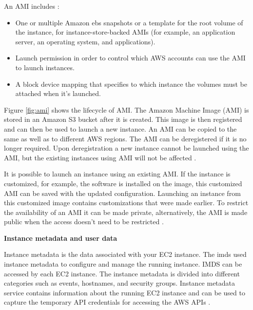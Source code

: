\par An AMI includes \cite{32}:
\begin{itemize}
    \item One or multiple Amazon \gls{ebs} snapshots or a
    template for the root volume of the instance, for instance-store-backed AMIs (for example, an application server, an operating system, and applications).
\end{itemize}
\begin{itemize}
    \item Launch permission in order to control which AWS accounts can use the AMI to launch instances.
\end{itemize}
\begin{itemize}
    \item A block device mapping that specifies to which instance the volumes must be attached when it’s launched.
\end{itemize}



\par Figure \ref{fig:ami} shows the lifecycle of AMI. The
Amazon Machine Image (AMI) is stored in an Amazon S3
bucket after it is created.
This image is then registered and can then be used to launch a new instance. An AMI can be
copied to the same as well as to different AWS regions.
The AMI can be deregistered if it is no longer required.
Upon deregistration a new instance cannot be launched
using the AMI, but the existing instances using AMI will
not be affected \cite{32}.

\par It is possible to launch an instance using an existing AMI. If the instance is customized, for example, the
software is installed on the image, this customized AMI can be saved with the updated configuration. Launching an
instance from this customized image contains customizations that were made earlier. To restrict the availability of
an AMI it can be made private, alternatively, the AMI is
made public when the access doesn’t need to be restricted \cite{33}.


\hfill \break

\textbf{Instance metadata and user data}
\par Instance metadata is the data associated with your EC2 instance.
The \gls{imds} used instance metadata to configure and
manage
the
running instance.
IMDS can be accessed by each EC2 instance.
The instance metadata is divided into different categories such as events, hostnames, and security
groups. Instance metadata service contains information
about the running EC2 instance and can be used to capture the temporary API credentials for accessing the AWS APIs \cite{34}.

